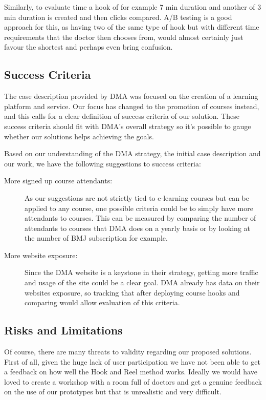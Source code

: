 Similarly, to evaluate time a hook of for example 7 min duration and another of 3 min duration is created and then clicks compared. A/B testing is a good approach for this, as having two of the same type of hook but with different time requirements that the doctor then chooses from, would almost certainly just favour the shortest and perhaps even bring confusion.

\subsection{Success Criteria}
The case description provided by DMA was focused on the creation of a learning platform and service. Our focus has changed to the promotion of courses instead, and this calls for a clear definition of success criteria of our solution. These success criteria should fit with DMA’s overall strategy so it’s possible to gauge whether our solutions helps achieving the goals.

Based on our understanding of the DMA strategy, the initial case description and our work, we have the following suggestions to success criteria:
\begin{description}
\item[More signed up course attendants:] As our suggestions are not strictly tied to e-learning courses but can be applied to any course, one possible criteria could be to simply have more attendants to courses. This can be measured by comparing the number of attendants to courses that DMA does on a yearly basis or by looking at the number of BMJ subscription for example.

\item[More website exposure:] Since the DMA website is a keystone in their strategy, getting more traffic and usage of the site could be a clear goal. DMA already has data on their websites exposure, so tracking that after deploying course hooks and comparing would allow evaluation of this criteria.
\end{description}

\subsection{Risks and Limitations}
Of course, there are many threats to validity regarding our proposed solutions. First of all, given the huge lack of user participation we have not been able to get a feedback on how well the Hook and Reel method works. Ideally we would have loved to create a workshop with a room full of doctors and get a genuine feedback on the use of our prototypes but that is unrealistic and very difficult.

